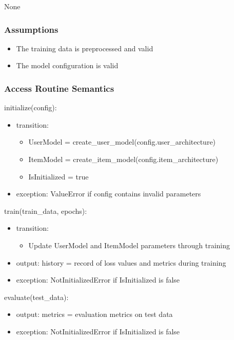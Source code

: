 \documentclass[12pt, titlepage]{article}
\begin{document}
None

\subsubsection{Assumptions}

\begin{itemize}
  \item The training data is preprocessed and valid
  \item The model configuration is valid
\end{itemize}

\subsubsection{Access Routine Semantics}

\noindent initialize(config):
\begin{itemize}
\item transition:
\begin{itemize}
  \item UserModel = create\_user\_model(config.user\_architecture)
  \item ItemModel = create\_item\_model(config.item\_architecture)
  \item IsInitialized = true
\end{itemize}
\item exception: ValueError if config contains invalid parameters
\end{itemize}

\noindent train(train\_data, epochs):
\begin{itemize}
\item transition:
  \begin{itemize}
    \item Update UserModel and ItemModel parameters through training
  \end{itemize}
\item output: history = record of loss values and metrics during training
\item exception: NotInitializedError if IsInitialized is false
\end{itemize}

\noindent evaluate(test\_data):
\begin{itemize}
\item output: metrics = evaluation metrics on test data
\item exception: NotInitializedError if IsInitialized is false
\end{itemize}
\end{document}
